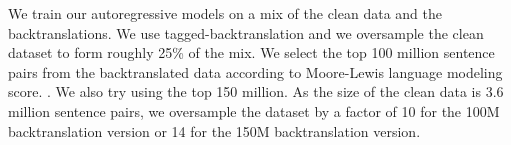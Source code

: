 We train our autoregressive models on a mix of the clean data and the
backtranslations. We use tagged-backtranslation and we oversample the clean
dataset to form roughly 25\% of the mix. We select the top 100 million sentence
pairs from the backtranslated data according to Moore-Lewis language modeling
score. . We also try using
the top 150 million.  As the size of the clean data is 3.6
million sentence pairs, we oversample the dataset by a factor of 10 for the 100M
backtranslation version or 14 for the 150M backtranslation version.


%

%

